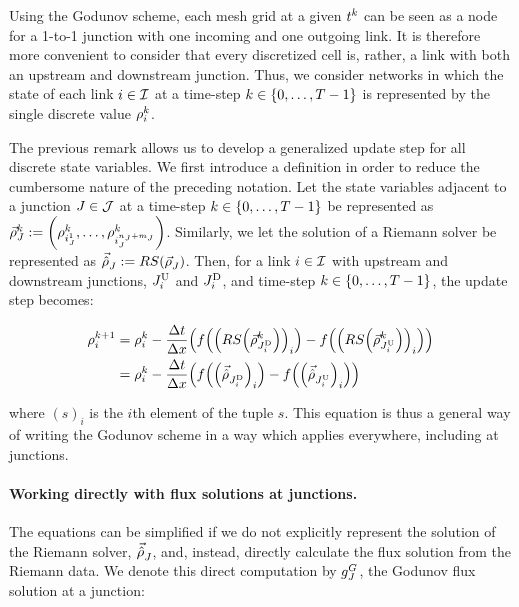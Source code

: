 \begin{rem}
Using the Godunov scheme, each mesh grid at a given $t^{k}$ can
be seen as a node for a 1-to-1 junction with one incoming and one
outgoing link. It is therefore more convenient to consider that every
discretized cell is, rather, a link with both an upstream and downstream
junction. Thus, we consider networks in which the state of each link
$i\in\mathcal{I}$ at a time-step $k\in\intrange 0{\ntime-1}$ is represented
by the single discrete value $\rho_{i}^{k}$.
\end{rem}
The previous remark allows us to develop a generalized update step
for all discrete state variables. We first introduce a definition
in order to reduce the cumbersome nature of the preceding notation.
Let the state variables adjacent to a junction $J\in\mathcal{J}$ at a
time-step $\tind\in\intrange 0{\ntime-1}$ be represented as $\juncstate{\jn}{\tind}\defeq\tuple{\discrete{\link_{\jn}^{1}}{\tind}}{\discrete{\link_{\jn}^{\ninc_{\jn}+\nout_{\jn}}}{\tind}}$.
Similarly, we let the solution of a Riemann solver be represented
as $\junctrace{\jn}{}\defeq\RS\left(\juncstate{\jn}{}\right)$. Then,
for a link $i\in\mathcal{I}$ with upstream and downstream junctions,
$J_{i}^{\text{U}}$ and $J_{i}^{\text{D}}$, and time-step $\tind\in\left\{ 0,\ldots,\ntime-1\right\} $,
the update step becomes:

\begin{align}
\discrete{\link}{\tind+1} & =\discrete{\link}{\tind}-\dfrac{\Delta t}{\Delta x}\left(f\left(\left(\RS\left(\juncstate{\jdown{\link}}{\tind}\right)\right)_{\link}\right)-f\left(\left(\RS\left(\juncstate{\jup{\link}}{\tind}\right)\right)_{\link}\right)\right)\nonumber \\
 & =\discrete{\link}{\tind}-\dfrac{\Delta t}{\Delta x}\left(f\left(\left(\junctrace{\jdown{\link}}{}\right)_{\link}\right)-f\left(\left(\junctrace{\jup{\link}}{}\right)_{\link}\right)\right)\label{eq:reg-update}
\end{align}


where $\left(s\right)_{i}$ is the $i$th element of the tuple $s$.
This equation is thus a general way of writing the Godunov scheme
in a way which applies everywhere, including at junctions.


\paragraph{Working directly with flux solutions at junctions.\label{par:Composing-the-Riemann}}

The equations can be simplified if we do not explicitly represent
the solution of the Riemann solver, $\vec{\hat{\rho}}_{J}^{}$, and, instead,
directly calculate the flux solution from the Riemann data. We denote
this direct computation by $g^{G}_{J}$, the Godunov flux solution
at a junction:

